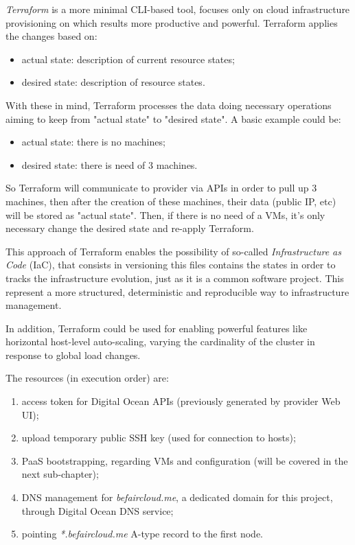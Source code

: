 \textit{Terraform} is a more minimal CLI-based tool, focuses only on cloud infrastructure provisioning on which results more productive and powerful.  Terraform applies the changes based on:
\begin{itemize}
\item actual state:  description of current resource states;
\item desired state:  description of resource states.
\end{itemize}

With these in mind, Terraform processes the data doing necessary operations aiming to keep from "actual state" to "desired state".  A basic example could be:
\begin{itemize}
\item actual state:  there is no machines;
\item desired state:  there is need of 3 machines.
\end{itemize}

So Terraform will communicate to provider via APIs in order to pull up 3 machines, then after the creation of these machines, their data (public IP, etc) will be stored as "actual state".  Then, if there is no need of a VMs, it's only necessary change the desired state and re-apply Terraform.

This approach of Terraform enables the possibility of so-called \textit{Infrastructure as Code} (IaC), that consists in versioning this files contains the states in order to tracks the infrastructure evolution, just as it is a common software project.  This represent a more structured, deterministic and reproducible way to infrastructure management.

In addition, Terraform could be used for enabling powerful features like horizontal host-level auto-scaling, varying the cardinality of the cluster in response to global load changes.

The resources (in execution order) are:
\begin{enumerate}
\item access token for Digital Ocean APIs (previously generated by provider Web UI);
\item upload temporary public SSH key (used for connection to hosts);
\item PaaS bootstrapping, regarding VMs and configuration (will be covered in the next sub-chapter);
\item DNS management for \textit{befaircloud.me}, a dedicated domain for this project, through Digital Ocean DNS service;
\item pointing \textit{*.befaircloud.me} A-type record to the first node.
\end{enumerate}

